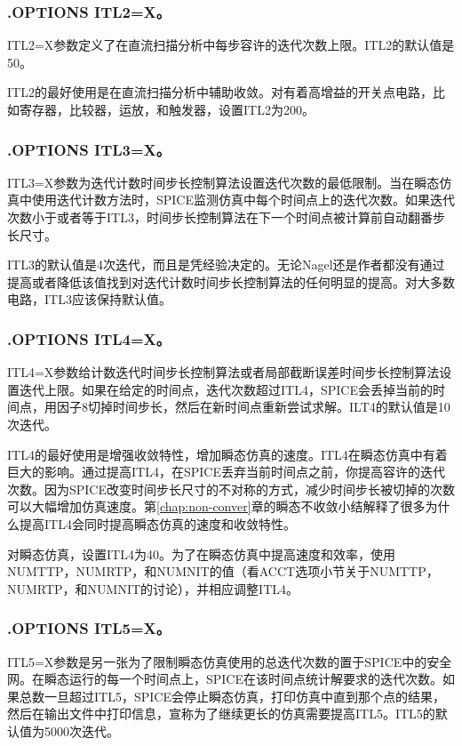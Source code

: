 \subsubsection{.OPTIONS ITL2=X。}
ITL2=X参数定义了在直流扫描分析中每步容许的迭代次数上限。ITL2的默认值是50。

ITL2的最好使用是在直流扫描分析中辅助收敛。对有着高增益的开关点电路，比如寄存器，比较器，运放，和触发器，设置ITL2为200。

\subsubsection{.OPTIONS ITL3=X。}
ITL3=X参数为迭代计数时间步长控制算法设置迭代次数的最低限制。当在瞬态仿真中使用迭代计数方法时，SPICE监测仿真中每个时间点上的迭代次数。如果迭代次数小于或者等于ITL3，时间步长控制算法在下一个时间点被计算前自动翻番步长尺寸。

ITL3的默认值是4次迭代，而且是凭经验决定的\cite{chap6-2}。无论Nagel还是作者都没有通过提高或者降低该值找到对迭代计数时间步长控制算法的任何明显的提高。对大多数电路，ITL3应该保持默认值。

\subsubsection{.OPTIONS ITL4=X。}
ITL4=X参数给计数迭代时间步长控制算法或者局部截断误差时间步长控制算法设置迭代上限。如果在给定的时间点，迭代次数超过ITL4，SPICE会丢掉当前的时间点，用因子8切掉时间步长，然后在新时间点重新尝试求解。ILT4的默认值是10次迭代。

ITL4的最好使用是增强收敛特性，增加瞬态仿真的速度。ITL4在瞬态仿真中有着巨大的影响。通过提高ITL4，在SPICE丢弃当前时间点之前，你提高容许的迭代次数。因为SPICE改变时间步长尺寸的不对称的方式，减少时间步长被切掉的次数可以大幅增加仿真速度。第\ref{chap:non-conver}章的瞬态不收敛小结解释了很多为什么提高ITL4会同时提高瞬态仿真的速度和收敛特性。

对瞬态仿真，设置ITL4为40。为了在瞬态仿真中提高速度和效率，使用NUMTTP，NUMRTP，和NUMNIT的值（看ACCT选项小节关于NUMTTP，NUMRTP，和NUMNIT的讨论），并相应调整ITL4。

\subsubsection{.OPTIONS ITL5=X。}
ITL5=X参数是另一张为了限制瞬态仿真使用的总迭代次数的置于SPICE中的安全网。在瞬态运行的每一个时间点上，SPICE在该时间点统计解要求的迭代次数。如果总数一旦超过ITL5，SPICE会停止瞬态仿真，打印仿真中直到那个点的结果，然后在输出文件中打印信息，宣称为了继续更长的仿真需要提高ITL5。ITL5的默认值为5000次迭代。

